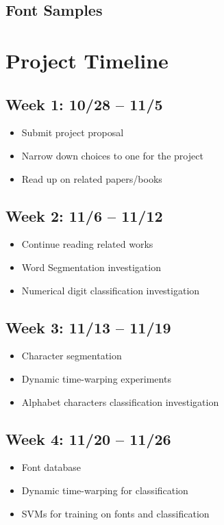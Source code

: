 \documentclass[12pt]{article}
\begin{document}
		\subsection{Font Samples}
		\label{appendix:data:font}
	\section{Project Timeline}
		\subsection*{Week 1: 10/28 -- 11/5 }
			\begin{itemize}
				\item{Submit project proposal}
				\item{Narrow down choices to one for the project}
				\item{Read up on related papers/books}
			\end{itemize}
		\subsection*{Week 2: 11/6 -- 11/12  }
			\begin{itemize}
				\item{Continue reading related works}
				\item{Word Segmentation investigation}
				\item{Numerical digit classification investigation}
			\end{itemize}
		\subsection*{Week 3: 11/13 -- 11/19}
			\begin{itemize}
				\item{Character segmentation}
				\item{Dynamic time-warping experiments}
				\item{Alphabet characters classification investigation}
			\end{itemize}
		\subsection*{Week 4: 11/20 -- 11/26}
			\begin{itemize}
				\item{Font database}
				\item{Dynamic time-warping for classification}
				\item{SVMs for training on fonts and classification}
			\end{itemize}
\end{document}
